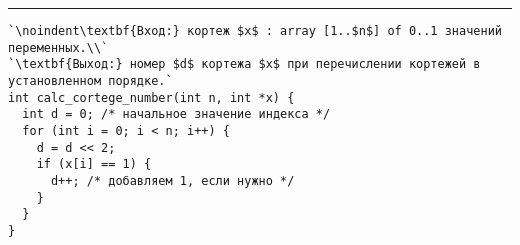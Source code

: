 \vspace{5pt} \hrule
\begin{lstlisting}[caption={Вычисление номера кортежа в установленном порядке}, label=p134_calc_cortege_number, escapechar=`]
`\noindent\textbf{Вход:} кортеж $x$ : array [1..$n$] of 0..1 значений переменных.\\`
`\textbf{Выход:} номер $d$ кортежа $x$ при перечислении кортежей в установленном порядке.`
int calc_cortege_number(int n, int *x) {
  int d = 0; /* начальное значение индекса */
  for (int i = 0; i < n; i++) {
    d = d << 2;
    if (x[i] == 1) {
      d++; /* добавляем 1, если нужнo */
    }
  }
}
\end{lstlisting}
